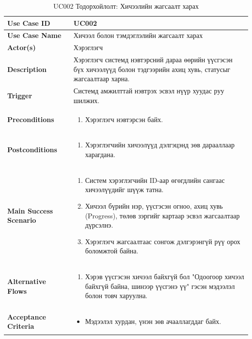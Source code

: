 \begin{longtable}{|p{4cm}|p{11cm}|}
\caption{UC002 Тодорхойлолт: Хичээлийн жагсаалт харах} \\
\hline
\textbf{Use Case ID} & UC002 \\ \hline
\textbf{Use Case Name} & Хичээл болон тэмдэглэлийн жагсаалт харах \\ \hline
\textbf{Actor(s)} & Хэрэглэгч \\ \hline
\textbf{Description} & Хэрэглэгч системд нэвтэрсний дараа өөрийн үүсгэсэн бүх хичээлүүд болон тэдгээрийн ахиц хувь, статусыг жагсаалтаар харна. \\ \hline
\textbf{Trigger} & Системд амжилттай нэвтрэх эсвэл нүүр хуудас руу шилжих. \\ \hline
\textbf{Preconditions} & 
\begin{enumerate}
    \item Хэрэглэгч нэвтэрсэн байх.
\end{enumerate} \\ \hline
\textbf{Postconditions} & 
\begin{enumerate}
    \item Хэрэглэгчийн хичээлүүд дэлгэцэнд зөв дарааллаар харагдана.
\end{enumerate} \\ \hline
\textbf{Main Success Scenario} & 
\begin{enumerate}
    \item Систем хэрэглэгчийн ID-аар өгөгдлийн сангаас хичээлүүдийг шүүж татна.
    \item Хичээл бүрийн нэр, үүсгэсэн огноо, ахиц хувь (Progress), төлөв зэргийг картаар эсвэл жагсаалтаар дүрсэлнэ.
    \item Хэрэглэгч жагсаалтаас сонгож дэлгэрэнгүй рүү орох боломжтой байна.
\end{enumerate} \\ \hline
\textbf{Alternative Flows} & 
\begin{enumerate}
    \item[1a.] Хэрэв үүсгэсэн хичээл байхгүй бол "Одоогоор хичээл байхгүй байна, шинээр үүсгэнэ үү" гэсэн мэдээлэл болон товч харуулна.
\end{enumerate} \\ \hline
\textbf{Acceptance Criteria} & 
\begin{itemize}
    \item Мэдээлэл хурдан, үнэн зөв ачааллагддаг байх.
\end{itemize} \\ \hline
\end{longtable}

